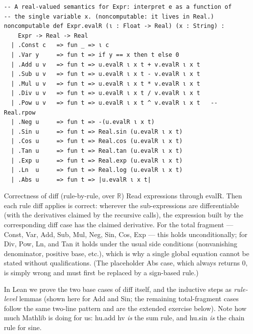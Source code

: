\documentclass[12pt, openany]{book}
\theoremstyle{plain}
\theoremstyle{definition}
\theoremstyle{remark}
\newcommand{\R}{\mathbb{R}}
\newcommand{\li}[1]{{\ttfamily\small\color{tealaccent}#1}}
\begin{document}
\begin{leanbox}
\begin{lstlisting}
-- A real-valued semantics for Expr: interpret e as a function of
-- the single variable x. (noncomputable: it lives in Real.)
noncomputable def Expr.evalR (ι : Float -> Real) (x : String) :
    Expr -> Real -> Real
  | .Const c   => fun _ => ι c
  | .Var y     => fun t => if y == x then t else 0
  | .Add u v   => fun t => u.evalR ι x t + v.evalR ι x t
  | .Sub u v   => fun t => u.evalR ι x t - v.evalR ι x t
  | .Mul u v   => fun t => u.evalR ι x t * v.evalR ι x t
  | .Div u v   => fun t => u.evalR ι x t / v.evalR ι x t
  | .Pow u v   => fun t => u.evalR ι x t ^ v.evalR ι x t   -- Real.rpow
  | .Neg u     => fun t => -(u.evalR ι x t)
  | .Sin u     => fun t => Real.sin (u.evalR ι x t)
  | .Cos u     => fun t => Real.cos (u.evalR ι x t)
  | .Tan u     => fun t => Real.tan (u.evalR ι x t)
  | .Exp u     => fun t => Real.exp (u.evalR ι x t)
  | .Ln  u     => fun t => Real.log (u.evalR ι x t)
  | .Abs u     => fun t => |u.evalR ι x t|
\end{lstlisting}
\end{leanbox}
\color{black}

\begin{thmbox}{Correctness of \li{diff} (rule-by-rule, over $\R$)}
Read expressions through \li{evalR}.  Then each rule \li{diff} applies is
correct: wherever the sub-expressions are differentiable (with the derivatives
claimed by the recursive calls), the expression built by the corresponding
\li{diff} case has the claimed derivative.  For the total fragment ---
\li{Const}, \li{Var}, \li{Add}, \li{Sub}, \li{Mul}, \li{Neg}, \li{Sin},
\li{Cos}, \li{Exp} --- this holds unconditionally; for \li{Div}, \li{Pow},
\li{Ln}, and \li{Tan} it holds under the usual side conditions (nonvanishing
denominator, positive base, etc.), which is why a single global equation
cannot be stated without qualifications.  (The placeholder \li{Abs} case,
which always returns $0$, is simply wrong and must first be replaced by a
sign-based rule.)
\end{thmbox}
\color{black}

In Lean we prove the two base cases of \li{diff} itself, and the inductive
steps as \emph{rule-level} lemmas (shown here for \li{Add} and \li{Sin}; the
remaining total-fragment cases follow the same two-line pattern and are the
extended exercise below).  Note how much Mathlib is doing for us: \li{hu.add hv}
\emph{is} the sum rule, and \li{hu.sin} \emph{is} the chain rule for sine.
\end{document}
